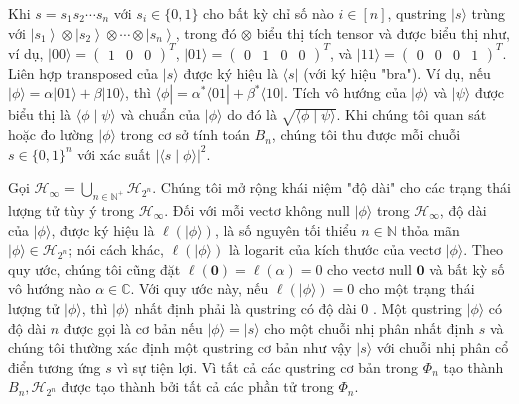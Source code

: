 \documentclass[10pt]{article}
\begin{document}
Khi $s=s_{1} s_{2} \cdots s_{n}$ với $s_{i} \in\{0,1\}$ cho bất kỳ chỉ số nào $i \in[n]$, qustring $|s\rangle$ trùng với $\left|s_{1}\right\rangle \otimes \left|s_{2}\right\rangle \otimes \cdots \otimes\left|s_{n}\right\rangle$, trong đó $\otimes$ biểu thị tích tensor và được biểu thị như, ví dụ, $|00\rangle=\left(\begin{array}{lll}1 & 0 & 0\end{array}\right)^{T}$, $|01\rangle=\left(\begin{array}{llll}0 & 1 & 0 & 0\end{array}\right)^{T}$, và $|11\rangle=\left(\begin{array}{llll}0 & 0 & 0 & 1\end{array}\right)^{T}$. Liên hợp transposed của $|s\rangle$ được ký hiệu là $\langle s|$ (với ký hiệu "bra"). Ví dụ, nếu $|\phi\rangle=\alpha|01\rangle+\beta|10\rangle$, thì $\langle\phi|=\alpha^{*}\langle 01|+\beta^{*}\langle 10|$. Tích vô hướng của $|\phi\rangle$ và $|\psi\rangle$ được biểu thị là $\langle\phi \mid \psi\rangle$ và chuẩn của $|\phi\rangle$ do đó là $\sqrt{\langle\phi \mid \psi\rangle}$. Khi chúng tôi quan sát hoặc đo lường $|\phi\rangle$ trong cơ sở tính toán $B_{n}$, chúng tôi thu được mỗi chuỗi $s \in\{0,1\}^{n}$ với xác suất $|\langle s \mid \phi\rangle|^{2}$.

Gọi $\mathcal{H}_{\infty}=\bigcup_{n \in \mathbb{N}^{+}} \mathcal{H}_{2^{n}}$. Chúng tôi mở rộng khái niệm "độ dài" cho các trạng thái lượng tử tùy ý trong $\mathcal{H}_{\infty}$. Đối với mỗi vectơ không null $|\phi\rangle$ trong $\mathcal{H}_{\infty}$, độ dài của $|\phi\rangle$, được ký hiệu là $\ell(|\phi\rangle)$, là số nguyên tối thiểu $n \in \mathbb{N}$ thỏa mãn $|\phi\rangle \in \mathcal{H}_{2^{n}}$; nói cách khác, $\ell(|\phi\rangle)$ là logarit của kích thước của vectơ $|\phi\rangle$. Theo quy ước, chúng tôi cũng đặt $\ell(\mathbf{0})=\ell(\alpha)=0$ cho vectơ null $\mathbf{0}$ và bất kỳ số vô hướng nào $\alpha \in \mathbb{C}$. Với quy ước này, nếu $\ell(|\phi\rangle)=0$ cho một trạng thái lượng tử $|\phi\rangle$, thì $|\phi\rangle$ nhất định phải là qustring có độ dài 0 . Một qustring $|\phi\rangle$ có độ dài $n$ được gọi là cơ bản nếu $|\phi\rangle=|s\rangle$ cho một chuỗi nhị phân nhất định $s$ và chúng tôi thường xác định một qustring cơ bản như vậy $|s\rangle$ với chuỗi nhị phân cổ điển tương ứng $s$ vì sự tiện lợi. Vì tất cả các qustring cơ bản trong $\Phi_{n}$ tạo thành $B_{n}, \mathcal{H}_{2^{n}}$ được tạo thành bởi tất cả các phần tử trong $\Phi_{n}$.
\end{document}
